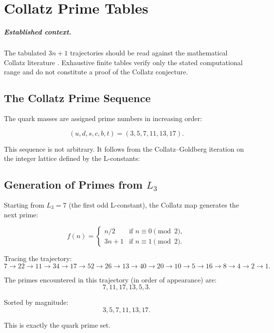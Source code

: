 \chapter{Collatz Prime Tables}
\label{app:collatz}


\paragraph{Established context.}
The tabulated $3n+1$ trajectories should be read against the mathematical Collatz
literature \cite{Terras1976,Lagarias1985,Wirsching1998,Tao2022Collatz}.  Exhaustive
finite tables verify only the stated computational range and do not constitute a
proof of the Collatz conjecture.

\section{The Collatz Prime Sequence}

The quark masses are assigned prime numbers in increasing order:

\[
(u,d,s,c,b,t) = (3,5,7,11,13,17).
\]

This sequence is not arbitrary.  It follows from the Collatz--Goldberg
iteration on the integer lattice defined by the L-constants:

\section{Generation of Primes from $L_3$}

Starting from $L_3 = 7$ (the first odd L-constant), the Collatz map
generates the next prime:

\[
f(n) = \begin{cases}
n/2 & \text{if } n \equiv 0 \pmod 2, \\
3n+1 & \text{if } n \equiv 1 \pmod 2.
\end{cases}
\]

Tracing the trajectory:
\[
7 \to 22 \to 11 \to 34 \to 17 \to 52 \to 26 \to 13 \to 40 \to 20 \to 10 \to 5 \to 16 \to 8 \to 4 \to 2 \to 1.
\]

The primes encountered in this trajectory (in order of appearance) are:
\[
7, 11, 17, 13, 5, 3.
\]

Sorted by magnitude:
\[
3, 5, 7, 11, 13, 17.
\]

This is exactly the quark prime set.

